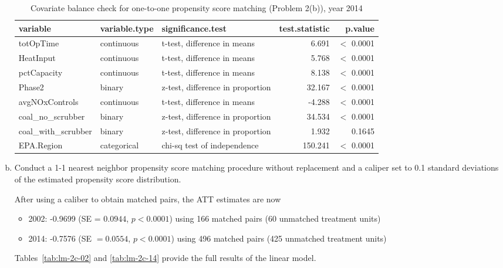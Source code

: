 \begin{enumerate}[(a)]
  \begin{table}[ht]
    \centering
    \begin{tabular}{lllrr}
      \toprule
      variable & variable.type & significance.test & test.statistic & p.value \\ 
      \midrule
      totOpTime & continuous & t-test, difference in means & 6.691 & $<$ 0.0001 \\ 
      HeatInput & continuous & t-test, difference in means & 5.768 & $<$ 0.0001 \\ 
      pctCapacity & continuous & t-test, difference in means & 8.138 & $<$ 0.0001 \\ 
      Phase2 & binary & z-test, difference in proportion & 32.167 & $<$ 0.0001 \\ 
      avgNOxControls & continuous & t-test, difference in means & -4.288 & $<$ 0.0001 \\ 
      coal\_no\_scrubber & binary & z-test, difference in proportion & 34.534 & $<$ 0.0001 \\ 
      coal\_with\_scrubber & binary & z-test, difference in proportion & 1.932 & 0.1645 \\ 
      EPA.Region & categorical & chi-sq test of independence & 150.241 & $<$ 0.0001 \\ 
      \bottomrule
    \end{tabular}
    \caption{Covariate balance check for one-to-one propensity score matching (Problem 2(b)), year 2014} 
    \label{tab-bal2b-14}
  \end{table}

\item
  \begin{quoting}
    Conduct a 1-1 nearest neighbor propensity score matching procedure
    without replacement and a caliper set to 0.1 standard deviations
    of the estimated propensity score distribution.
  \end{quoting}
  After using a caliber to obtain matched pairs, the ATT estimates are
  now
  \begin{itemize}
  \item 2002: -0.9699 (SE = $0.0944$, $p < 0.0001$) using 166 matched
    pairs (60 unmatched treatment units)
  \item 2014: -0.7576 (SE $= 0.0554$, $p < 0.0001$) using 496 matched
    pairs (425 unmatched treatment units)
  \end{itemize}
  Tables~\ref{tab:lm-2c-02} and \ref{tab:lm-2c-14} provide the full
  results of the linear model.


\end{enumerate}
